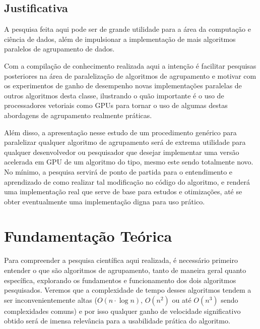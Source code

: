 \documentclass[12pt,
openright, 
oneside, %
a4paper,    %
brazil]{facom-ufu-abntex2}
\def\qntAlgrtm{dois}
\begin{document}

\section{Justificativa}

A pesquisa feita aqui pode ser de grande utilidade para a área da computação e ciência de dados, além de impulsionar a implementação de mais algoritmos paralelos de agrupamento de dados.

Com a compilação de conhecimento realizada aqui a intenção é facilitar pesquisas posteriores na área de paralelização de algoritmos de agrupamento e motivar com os experimentos de ganho de desempenho novas implementações paralelas de outros algoritmos desta classe, ilustrando o quão importante é o uso de processadores vetoriais como GPUs para tornar o uso de algumas destas abordagens de agrupamento realmente práticas.

Além disso, a apresentação nesse estudo de um procedimento genérico para paralelizar qualquer algoritmo de agrupamento será de extrema utilidade para qualquer desenvolvedor ou pesquisador que desejar implementar uma versão acelerada em GPU de um algoritmo do tipo, mesmo este sendo totalmente novo. No mínimo, a pesquisa servirá de ponto de partida para o entendimento e aprendizado de como realizar tal modificação no código do algoritmo, e renderá uma implementação real que serve de base para estudos e otimizações, até se obter eventualmente uma implementação digna para uso prático.





\chapter{Fundamentação Teórica}

Para compreender a pesquisa científica aqui realizada, é necessário primeiro entender o que são algoritmos de agrupamento, tanto de maneira geral quanto específica, explorando os fundamentos e funcionamento dos \qntAlgrtm{} algoritmos pesquisados. Veremos que a complexidade de tempo desses algoritmos tendem a ser inconvenientemente altas ($O(n\cdot\log{n})$, $O(n^2)$ ou até $O(n^3)$ sendo complexidades comuns) e por isso qualquer ganho de velocidade significativo obtido será de imensa relevância para a usabilidade prática do algoritmo.
\end{document}
